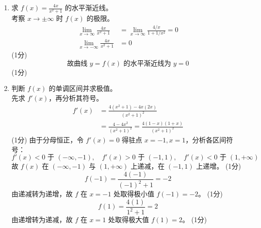 \documentclass[12pt,a4paper]{exam-zh}
\begin{document}
\begin{solution}
    \begin{enumerate}[label=(\alph*)]
        \item 求 $\displaystyle f(x)=\frac{4x}{x^2+1}$ 的水平渐近线。 \\
        考察 $x \to \pm\infty$ 时 $f(x)$ 的极限。
        \begin{align*}
            \lim_{x\to\infty} \frac{4x}{x^2+1} &= \lim_{x\to\infty} \frac{4/x}{1+1/x^2} = 0 \\
            \lim_{x\to-\infty} \frac{4x}{x^2+1} &= 0
        \end{align*}
        \hfill (1分)
        \[
            \text{故曲线 } y=f(x) \text{ 的水平渐近线为 } y=0
        \]
        \hfill (1分)

        \item 判断 $f(x)$ 的单调区间并求极值。 \\
        先求 $f'(x)$，再分析其符号。
        \begin{align*}
            f'(x) &= \frac{4(x^2+1) - 4x(2x)}{(x^2+1)^2} \\
            &= \frac{4-4x^2}{(x^2+1)^2} = \frac{4(1-x)(1+x)}{(x^2+1)^2}
        \end{align*}
        \hfill (1分)
        由于分母恒正，令 $f'(x)=0$ 得驻点 $x=-1, x=1$，分析各区间符号：
        \[
            f'(x) < 0 \text{ 于 } (-\infty,-1), \quad f'(x) > 0 \text{ 于 } (-1,1), \quad f'(x) < 0 \text{ 于 } (1,+\infty)
        \]
        故 $f(x)$ 在 $(-\infty,-1)$ 与 $(1,+\infty)$ 上递减，在 $(-1,1)$ 上递增。
        \hfill (1分)
        \[
            f(-1) = \frac{4(-1)}{(-1)^2+1} = -2
        \]
        由递减转为递增，故 $f$ 在 $x=-1$ 处取得极小值 $f(-1) = -2$。
        \hfill (1分)
        \[
            f(1) = \frac{4(1)}{1^2+1} = 2
        \]
        由递增转为递减，故 $f$ 在 $x=1$ 处取得极大值 $f(1) = 2$。
        \hfill (1分)


\end{enumerate}
\end{solution}
\end{document}
